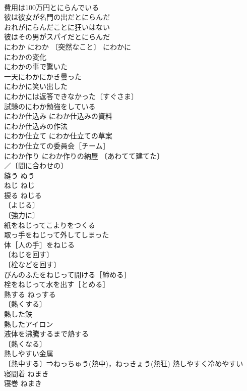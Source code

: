 \documentclass[8pt]{extreport}
\begin{document}
\begin{CJK}{UTF8}{min}
\\	費用は100万円とにらんでいる 
\\	彼は彼女が名門の出だとにらんだ 
\\	おれがにらんだことに狂いはない 
\\	彼はその男がスパイだとにらんだ 
\\	にわか	にわか	〔突然なこと〕 にわかに 
\\	にわかの変化 
\\	にわかの事で驚いた 
\\	一天にわかにかき曇った 
\\	にわかに笑い出した 
\\	にわかには返答できなかった〔すぐさま〕 
\\	試験のにわか勉強をしている 
\\	にわか仕込み にわか仕込みの資料 
\\	にわか仕込みの作法 
\\	にわか仕立て にわか仕立ての草案 
\\	にわか仕立ての委員会［チーム］ 
\\	にわか作り にわか作りの納屋 〔あわてて建てた〕
\\	／〔間に合わせの〕
\\	縫う	ぬう	
\\	ねじ	ねじ	
\\	捩る	ねじる	
\\	〔よじる〕
\\	〔強力に〕
\\	紙をねじってこよりをつくる 
\\	取っ手をねじって外してしまった 
\\	体［人の手］をねじる 
\\	〔ねじを回す〕
\\	〔栓などを回す〕
\\	びんのふたをねじって開ける［締める］ 
\\	栓をねじって水を出す［とめる］ 
\\	熱する	ねっする	
\\	〔熱くする〕
\\	熱した鉄 
\\	熱したアイロン 
\\	液体を沸騰するまで熱する 
\\	〔熱くなる〕
\\	熱しやすい金属 
\\	〔熱中する〕⇒ねっちゅう(熱中)，ねっきょう(熱狂) 熱しやすく冷めやすい 
\\	寝間着	ねまき	
\\	寝巻	ねまき	

\end{CJK}
\end{document}
